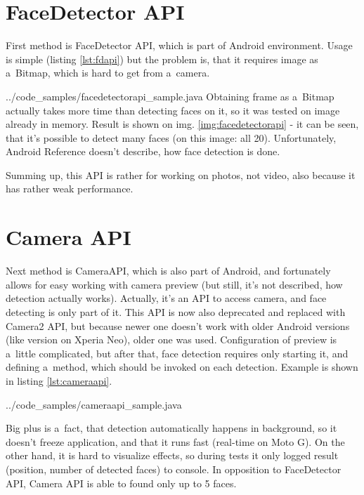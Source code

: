 
\section{FaceDetector API}
First method is FaceDetector API, which is part of Android environment.
Usage is simple (listing \ref{lst:fdapi}) but the problem is, that it requires
image as a~Bitmap, which is hard to get from a~camera.

{../code_samples/facedetectorapi_sample.java}
Obtaining frame as a~Bitmap actually takes more time than detecting faces on it,
so it was tested on image already in memory.
Result is shown on img. \ref{img:facedetectorapi} - it can be seen, that it's
possible to detect many faces (on this image: all 20).
Unfortunately, Android Reference \cite{android_reference} doesn't describe, how
face detection is done.

Summing up, this API is rather for working on photos, not video, also
because it has rather weak performance.


\section{Camera API}
Next method is CameraAPI, which is also part of Android, and fortunately allows
for easy working with camera preview (but still, it's not described, how
detection actually works).
Actually, it's an API to access camera, and face detecting is only part of it.
This API is now also deprecated and replaced with Camera2 API, but because newer
one doesn't work with older Android versions (like version on Xperia Neo), older
one was used. 
Configuration of preview is a~little complicated, but after that,
face detection requires only starting it, and defining a~method, which should be
invoked on each detection. Example is shown in listing \ref{lst:cameraapi}.

{../code_samples/cameraapi_sample.java}

Big plus is a~fact, that detection automatically happens in background, so it
doesn't freeze application, and that it runs fast (real-time on Moto G).
On the other hand, it is hard to visualize effects, so during tests it only
logged result (position, number of detected faces) to console.
In opposition to FaceDetector API, Camera API is able to found only up to 5
faces.

